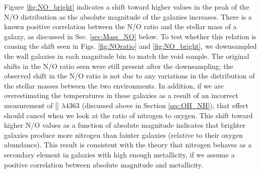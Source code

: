 Figure \ref{fig:NO_bright} indicates a shift toward higher values in the peak of 
the N/O distribution as the absolute magnitude of the galaxies increases.  There 
is a known positive correlation between the N/O ratio and the stellar mass of a 
galaxy, as discussed in Sec. \ref{sec:Mass_NO} below.  To test whether this 
relation is causing the shift seen in Figs. \ref{fig:NOratio} and 
\ref{fig:NO_bright}, we downsampled the wall galaxies in each magnitude bin to 
match the void sample.  The original shifts in the N/O ratio seen were still 
present after the downsampling; the observed shift in the N/O ratio is not due 
to any variations in the distribution of the stellar masses between the two 
environments.  In addition, if we are overestimating the temperatures in these 
galaxies as a result of an incorrect measurement of [] $\lambda 4363$ 
(discussed above in Section \ref{sec:OH_NH}), that effect should cancel when we 
look at the ratio of nitrogen to oxygen.  This shift toward higher N/O values as 
a function of absolute magnitude indicates that brighter galaxies produce more 
nitrogen than fainter galaxies (relative to their oxygen abundance).  This 
result is consistent with the theory that nitrogen behaves as a secondary 
element in galaxies with high enough metallicity, if we assume a positive 
correlation between absolute magnitude and metallicity.

